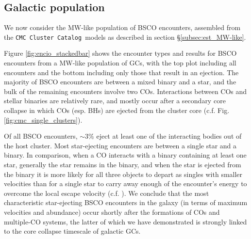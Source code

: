 \documentclass[twocolumn]{aastex631}
\newcommand{\CMCcat}{\texttt{CMC Cluster Catalog}}
\begin{document}
\subsection{Galactic population} \label{subsec:res_MW-like}

We now consider the MW-like population of BSCO encounters, assembled from the \CMCcat\ models as described in section \S\ref{subsec:est_MW-like}.

Figure \ref{fig:encio_stackedbar} shows the encounter types and results for BSCO encounters from a MW-like population of GCs, with the top plot including all encounters and the bottom including only those that result in an ejection.
The majority of BSCO encounters are between a mixed binary and a star, and the bulk of the remaining encounters involve two COs.
Interactions between COs and stellar binaries are relatively rare, and mostly occur after a secondary core collapse in which COs (esp. BHs) are ejected from the cluster core (c.f. Fig. \ref{fig:cmc_single_clusters}).


Of all BSCO encounters, $\sim3\%$ eject at least one of the interacting bodies out of the host cluster.
Most star-ejecting encounters are between a single star and a binary.
In comparison, when a CO interacts with a binary containing at least one star, generally the star remains in the binary, and when the star is ejected from the binary it is more likely for all three objects to depart as singles with smaller velocities than for a single star to carry away enough of the encounter's energy to overcome the local escape velocity (c.f. \citet{1983ApJ...268..319H}).
We conclude that the most characteristic star-ejecting BSCO encounters in the galaxy (in terms of maximum velocities and abundance) occur shortly after the formations of COs and multiple-CO systems, the latter of which we have demonstrated is strongly linked to the core collapse timescale of galactic GCs.
\end{document}
